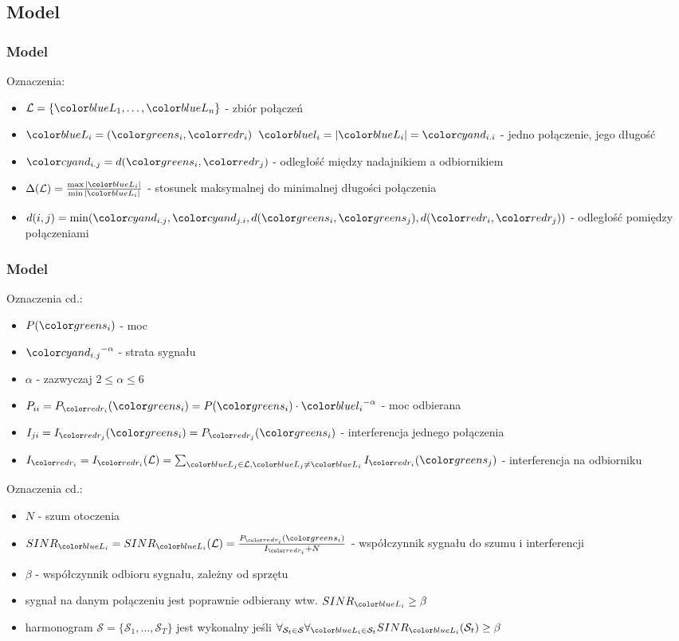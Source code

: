 \documentclass[polish, t,10pt]{beamer}
\begin{document}
\subsection{Model}
    \begin{frame}
        \frametitle{Model}
        Oznaczenia:
        \begin{itemize}
            \item $\mathcal{L} = \{\Lo, \ldots, \Ln\}$ - zbiór połączeń
            \item $\Li = (\si, \ri)$ $\li = |\Li| = \dii$ - jedno połączenie, jego długość
            \item $\dij = d(\si, \rj)$ - odległość między nadajnikiem a odbiornikiem
            \item $\Delta(\mathcal{L}) = \frac{\max{|\Li|}}{\min{|\Li|}}$ - stosunek maksymalnej do minimalnej długości połączenia
            \item $d(i,j) = \min(\dij, \dji, d(\si, \sj), d(\ri, \rj))$ - odległość pomiędzy połączeniami
        \end{itemize}
    \end{frame}
    \begin{frame}
        \frametitle{Model}
        Oznaczenia cd.:
        \begin{itemize}
            \item $P(\si)$ - moc
            \item $\dij^{-\alpha}$ - strata sygnału
            \item $\alpha$ - zazwyczaj $2 \le \alpha \leq 6$
            \item $P_{ii} = P_{\ri}(\si) = P(\si) \cdot \li^{-\alpha}$ - moc odbierana
            \item $I_{ji} = I_{\rj}(\si) = P_{\rj}(\si)$ - interferencja jednego połączenia
            \item $I_{\ri} = I_{\ri}(\mathcal{L}) = \sum_{\Lj \in \mathcal{L}, \Lj \neq \Li} I_{\ri}(\sj)$ - interferencja na odbiorniku
        \end{itemize}
    \end{frame}
    \begin{frame}
        Oznaczenia cd.:
        \begin{itemize}
            \item $N$ - szum otoczenia
            \item $SINR_{\Li} = SINR_{\Li}(\mathcal{L}) = \frac{P_{\ri}(\si)}{I_{\ri} + N}$ - współczynnik sygnału do szumu i interferencji
            \item $\beta$ - współczynnik odbioru sygnału, zależny od sprzętu
            \item sygnał na danym połączeniu jest poprawnie odbierany wtw. $SINR_{\Li} \geq \beta$
            \item harmonogram $\mathcal{S} = \{\mathcal{S}_1, \ldots, \mathcal{S}_T\}$ jest wykonalny jeśli $\forall_{\mathcal{S}_t \in \mathcal{S}} \forall_{\Li \in \mathcal{S}_t} SINR_{\Li}(\mathcal{S}_t) \geq \beta$
        \end{itemize}
    \end{frame}
\end{document}
